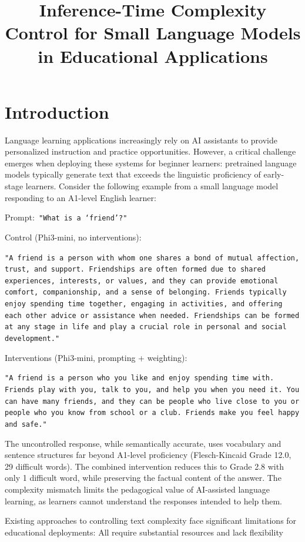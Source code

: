 \documentclass[10pt, a4paper]{article}
\title{Inference-Time Complexity Control for Small Language Models in Educational Applications}
\let\oldtexttt\texttt
\renewcommand{\texttt}[1]{{\small\oldtexttt{#1}}}
\begin{document}
\maketitleabstract
\section{Introduction}
Language learning applications increasingly rely on AI assistants to provide personalized instruction and practice opportunities. However, a critical challenge emerges when deploying these systems for beginner learners: pretrained language models typically generate text that exceeds the linguistic proficiency of early-stage learners. Consider the following example from a small language model responding to an A1-level English learner:

Prompt:\texttt{ "What is a `friend'?"}

Control (Phi3-mini, no interventions):

\texttt{"A friend is a person with whom one shares a bond of mutual affection, trust, and support. Friendships are often formed due to shared experiences, interests, or values, and they can provide emotional comfort, companionship, and a sense of belonging. Friends typically enjoy spending time together, engaging in activities, and offering each other advice or assistance when needed. Friendships can be formed at any stage in life and play a crucial role in personal and social development."}

Interventions (Phi3-mini, prompting + weighting):

\texttt{"A friend is a person who you like and enjoy spending time with. Friends play with you, talk to you, and help you when you need it. You can have many friends, and they can be people who live close to you or people who you know from school or a club. Friends make you feel happy and safe."}

The uncontrolled response, while semantically accurate, uses vocabulary and sentence structures far beyond A1-level proficiency (Flesch-Kincaid Grade 12.0, 29 difficult words).
The combined intervention reduces this to Grade 2.8 with only 1 difficult word, while preserving the factual content of the answer.
The complexity mismatch limits the pedagogical value of AI-assisted language learning, as learners cannot understand the responses intended to help them.

Existing approaches to controlling text complexity face significant limitations for educational deployments: All require substantial resources and lack flexibility

\end{document}
